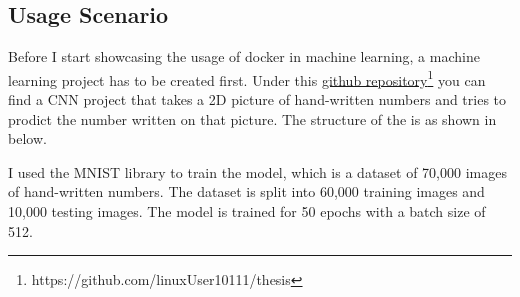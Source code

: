 \subsection{Usage Scenario}
Before I start showcasing the usage of docker in machine learning, a machine learning project has to be created first. Under this \href{https://github.com/linuxUser10111/thesis}{github repository}\footnote{https://github.com/linuxUser10111/thesis} you can find a \ac{CNN} project that takes a 2D picture of hand-written numbers and tries to prodict the number written on that picture.
The structure of the is as shown in below.

\newline
I used the MNIST library to train the model, which is a dataset of 70,000 images of hand-written numbers.
The dataset is split into 60,000 training images and 10,000 testing images.
The model is trained for 50 epochs with a batch size of 512.
